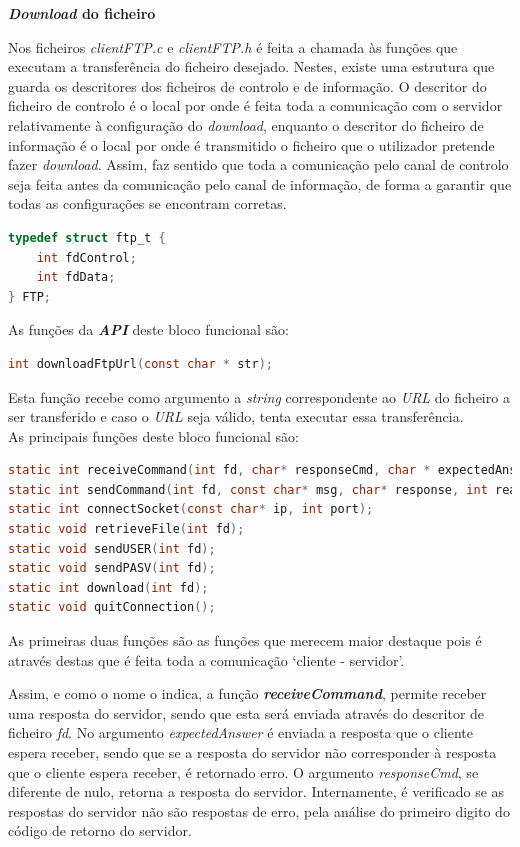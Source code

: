 \documentclass[a4paper, 11pt]{article}
\begin{document}
\large\textbf{\textit{Download} do ficheiro}\\
\normalsize

Nos ficheiros \textit{clientFTP.c} e \textit{clientFTP.h} é feita a chamada às funções que executam a transferência do ficheiro desejado. Nestes, existe uma estrutura  que guarda os descritores dos ficheiros de controlo e de informação. O descritor do ficheiro de controlo é o local por onde é feita toda a comunicação com o servidor relativamente à configuração do \textit{download}, enquanto o descritor do ficheiro de informação é o local por onde é transmitido o ficheiro que o utilizador pretende fazer \textit{download}. Assim, faz sentido que toda a comunicação pelo canal de controlo seja feita antes da comunicação pelo canal de informação, de forma a garantir que todas as configurações se encontram corretas.

\begin{lstlisting}[language=C]
typedef struct ftp_t {
	int fdControl;
	int fdData;
} FTP;
\end{lstlisting}  

As  funções da \textit{\textbf{API}} deste bloco funcional são:

\begin{lstlisting}[language=C]
int downloadFtpUrl(const char * str);
\end{lstlisting}

Esta função recebe como argumento a \textit{string} correspondente ao \textit{URL} do ficheiro a ser transferido e caso o \textit{URL} seja válido, tenta executar essa transferência.\\

As principais funções deste bloco funcional são:

\begin{lstlisting}[language=C]
static int receiveCommand(int fd, char* responseCmd, char * expectedAnswer);
static int sendCommand(int fd, const char* msg, char* response, int readResponse, char * expectedAnswer);
static int connectSocket(const char* ip, int port);
static void retrieveFile(int fd);
static void sendUSER(int fd);
static void sendPASV(int fd);
static int download(int fd);
static void quitConnection();
\end{lstlisting}

As primeiras duas funções são as funções que merecem maior destaque pois é através destas que é feita toda a comunicação `cliente - servidor'.

 Assim, e como o nome o indica, a função \textbf{\textit{receiveCommand}}, permite receber uma resposta do servidor, sendo que esta será enviada através do descritor de ficheiro \textit{fd}.  No argumento \textit{expectedAnswer} é enviada a resposta que o cliente espera receber, sendo que se a resposta do servidor não corresponder à resposta que o cliente espera receber, é retornado erro. O argumento \textit{responseCmd}, se diferente de nulo, retorna a resposta do servidor. Internamente, é verificado se as respostas do servidor não são respostas de erro, pela análise do primeiro digito do código de retorno do servidor.
\end{document}
